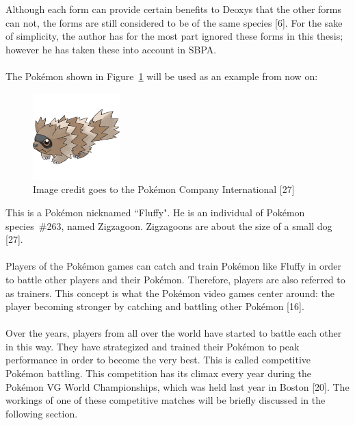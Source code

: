 \documentclass{article}
\begin{document}
Although each form can provide certain benefits to Deoxys that the other forms can not, the forms are still considered to be of the same species [6]. For the sake of simplicity, the author has for the most part ignored these forms in this thesis; however he has taken these into account in SBPA.\\\\
The Pok\'emon shown in Figure~\ref{fluffypic} will be used as an example from now on:
\begin{figure}[H]
	\includegraphics[width=0.30\textwidth]{fluffy.png}
	\centering
	\caption{Image credit goes to the Pok\'emon Company International [27]}\label{fluffypic}
\end{figure}
This is a Pok\'emon nicknamed ``Fluffy". He is an individual of Pok\'emon species~\#263, named Zigzagoon. Zigzagoons are about the size of a small dog [27].\\\\
Players of the Pok\'emon games can catch and train Pok\'emon like Fluffy in order to battle other players and their Pok\'emon. Therefore, players are also referred to as trainers. This concept is what the Pok\'emon video games center around: the player becoming stronger by catching and battling other Pok\'emon [16].\\\\
Over the years, players from all over the world have started to battle each other in this way. They have strategized and trained their Pok\'emon to peak performance in order to become the very best. This is called competitive Pok\'emon battling. This competition has its climax every year during the Pok\'emon VG World Championships, which was held last year in Boston [20].
The workings of one of these competitive matches will be briefly discussed in the following section.
\end{document}
